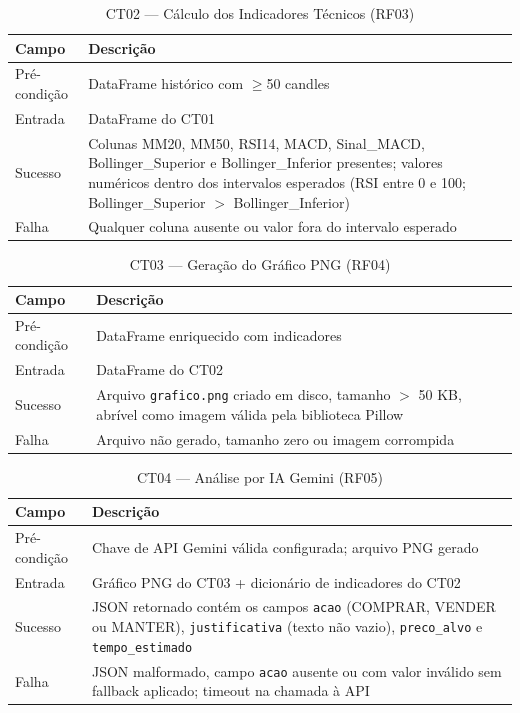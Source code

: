 \documentclass[conference]{IEEEtran}
\begin{document}
\begin{table}[H]
  \centering
  \caption{CT02 — Cálculo dos Indicadores Técnicos (RF03)}
  \label{tab:ct02}
  \begin{tabular}{p{2.5cm}p{5cm}}
    \toprule
    \textbf{Campo} & \textbf{Descrição} \\
    \midrule
    Pré-condição  & DataFrame histórico com $\geq$50 candles \\
    Entrada       & DataFrame do CT01 \\
    Sucesso       & Colunas MM20, MM50, RSI14, MACD, Sinal\_MACD, Bollinger\_Superior e Bollinger\_Inferior presentes; valores numéricos dentro dos intervalos esperados (RSI entre 0 e 100; Bollinger\_Superior $>$ Bollinger\_Inferior) \\
    Falha         & Qualquer coluna ausente ou valor fora do intervalo esperado \\
    \bottomrule
  \end{tabular}
\end{table}

\begin{table}[H]
  \centering
  \caption{CT03 — Geração do Gráfico PNG (RF04)}
  \label{tab:ct03}
  \begin{tabular}{p{2.5cm}p{5cm}}
    \toprule
    \textbf{Campo} & \textbf{Descrição} \\
    \midrule
    Pré-condição  & DataFrame enriquecido com indicadores \\
    Entrada       & DataFrame do CT02 \\
    Sucesso       & Arquivo \texttt{grafico.png} criado em disco, tamanho $>$ 50 KB, abrível como imagem válida pela biblioteca Pillow \\
    Falha         & Arquivo não gerado, tamanho zero ou imagem corrompida \\
    \bottomrule
  \end{tabular}
\end{table}

\begin{table}[H]
  \centering
  \caption{CT04 — Análise por IA Gemini (RF05)}
  \label{tab:ct04}
  \begin{tabular}{p{2.5cm}p{5cm}}
    \toprule
    \textbf{Campo} & \textbf{Descrição} \\
    \midrule
    Pré-condição  & Chave de API Gemini válida configurada; arquivo PNG gerado \\
    Entrada       & Gráfico PNG do CT03 + dicionário de indicadores do CT02 \\
    Sucesso       & JSON retornado contém os campos \texttt{acao} (COMPRAR, VENDER ou MANTER), \texttt{justificativa} (texto não vazio), \texttt{preco\_alvo} e \texttt{tempo\_estimado} \\
    Falha         & JSON malformado, campo \texttt{acao} ausente ou com valor inválido sem fallback aplicado; timeout na chamada à API \\
    \bottomrule
  \end{tabular}
\end{table}
\end{document}
